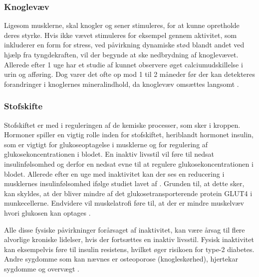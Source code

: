 \subsubsection{Knoglevæv}
Ligesom musklerne, skal knogler og sener stimuleres, for at kunne opretholde deres styrke. 
Hvis ikke vævet stimuleres for eksempel gennem aktivitet, som inkluderer en form for stress, ved påvirkning dynamiske stød blandt andet ved hjælp fra tyngdekraften, vil der begynde at ske nedbrydning af knoglevævet. 
Allerede efter 1 uge har et studie af \citeauthor{Bloomfield1995} kunnet observere øget calciumudskillelse i urin og afføring. 
Dog varer det ofte op mod 1 til 2 måneder før der kan detekteres forandringer i knoglernes mineralindhold, da knoglevæv omsættes langsomt \citep{Bloomfield1995}.

\subsubsection{Stofskifte}
Stofskiftet er med i reguleringen af de kemiske processer, som sker i kroppen. 
Hormoner spiller en vigtig rolle inden for stofskiftet, heriblandt hormonet insulin, som er vigtigt for glukoseoptagelse i musklerne og for regulering af glukosekoncentrationen i blodet. 
En inaktiv livsstil vil føre til nedsat insulinfølsomhed og derfor en nedsat evne til at regulere glukosekoncentrationen i blodet. 
Allerede efter en uge med inaktivitet kan der ses en reducering i musklernes insulinfølsomhed ifølge studiet lavet af \citeauthor{Mikines1991}. 
Grunden til, at dette sker, kan skyldes, at der bliver mindre af det glukosetransporterende protein GLUT4 i munkecellerne. 
Endvidere vil muskelatrofi føre til, at der er mindre muskelvæv hvori glukosen kan optages \citep{Tabata1999}.

\noindent
Alle disse fysiske påvirkninger forårsaget af inaktivitet, kan være årsag til flere alvorlige kroniske lidelser, hvis der fortsættes en inaktiv livsstil. 
Fysisk inaktivitet kan eksempelvis føre til insulin resistens, hvilket øger risikoen for type-2 diabetes. 
Andre sygdomme som kan nævnes er osteoporose (knogleskørhed), hjertekar sygdomme og overvægt \citep{motionsraad2007}.